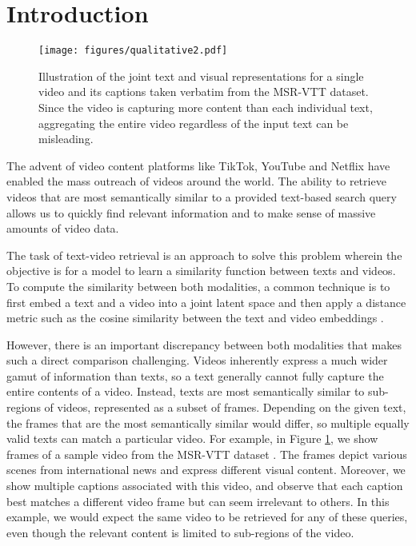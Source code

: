 \documentclass[10pt,twocolumn,letterpaper]{article}
\begin{document}
\section{Introduction}
\begin{figure}[t]\centering
           \texttt{[image: figures/qualitative2.pdf]}\\
  \caption{Illustration of the joint text and visual representations for a single video and its captions taken verbatim from the MSR-VTT dataset. Since the video is capturing more content than each individual text, aggregating the entire video regardless of the input text can be misleading.}
\label{fig:examples}
\vspace{-0.4cm}
\end{figure}
The advent of video content platforms like TikTok, YouTube and Netflix have enabled the mass outreach of videos around the world.
The ability to retrieve videos that are most semantically similar to a provided text-based search query allows us to quickly find relevant information and to make sense of massive amounts of video data.

The task of text-video retrieval is an approach to solve this problem wherein the objective is for a model to learn a similarity function between texts and videos. To compute the similarity between both modalities, a common technique is to first embed a text and a video into a joint latent space and then apply a distance metric such as the cosine similarity between the text and video embeddings
\cite{liu2019use, gabeur2020multi, bain2021frozen}.

However, there is an important discrepancy between both modalities that makes such a direct comparison challenging.
Videos inherently express a much wider gamut of information than texts, so a text generally cannot fully capture the entire contents of a video. Instead, texts are most semantically similar to sub-regions of videos, represented as a subset of frames. Depending on the given text, the frames that are the most semantically similar would differ, so multiple equally valid texts can match a particular video. For example, in Figure \ref{fig:examples}, we show frames of a sample video from the MSR-VTT dataset \cite{xu2016msr}. The frames depict various scenes from international news and express different visual content. Moreover, we show multiple captions associated with this video, and observe that each caption best matches a different video frame but can seem irrelevant to others. In this example, we would expect the same video to be retrieved for any of these queries, even though the relevant content is limited to sub-regions of the video.
\end{document}
